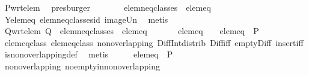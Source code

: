\begin{isabellebody}
\ P{\isacharunderscore}wrt{\isacharunderscore}elem\ \isamarkupfalse%
\ presburger\isanewline
\ \ \isamarkupfalse%
\ \isamarkupfalse%
\ {\isachardoublequoteopen}{\isasymdots}\ {\isacharequal}\ {\isacharquery}elem{\isacharunderscore}neq{\isacharunderscore}classes\ {\isasymunion}\ {\isacharbraceleft}{\isacharquery}elem{\isacharunderscore}eq{\isacharbraceright}\ {\isacharminus}\ {\isacharbraceleft}{\isacharbraceleft}{\isacharbraceright}{\isacharbraceright}{\isachardoublequoteclose}\isanewline
\ \ \ \ \isamarkupfalse%
\ Y{\isacharunderscore}elem{\isacharunderscore}eq\ elem{\isacharunderscore}neq{\isacharunderscore}classes{\isacharunderscore}id\ image{\isacharunderscore}Un\ \isamarkupfalse%
\ metis\isanewline
\ \ \isamarkupfalse%
\ \isamarkupfalse%
\ Q{\isacharunderscore}wrt{\isacharunderscore}elem{\isacharcolon}\ {\isachardoublequoteopen}{\isacharquery}Q\ {\isacharequal}\ {\isacharquery}elem{\isacharunderscore}neq{\isacharunderscore}classes\ {\isasymunion}\ {\isacharbraceleft}{\isacharquery}elem{\isacharunderscore}eq{\isacharbraceright}\ {\isacharminus}\ {\isacharbraceleft}{\isacharbraceleft}{\isacharbraceright}{\isacharbraceright}{\isachardoublequoteclose}\ \isacommand{{\isachardot}}\isamarkupfalse%
\isanewline
\isanewline
\ \ \isamarkupfalse%
\ {\isachardoublequoteopen}{\isacharquery}elem{\isacharunderscore}eq\ {\isacharequal}\ {\isacharbraceleft}{\isacharbraceright}\ {\isasymor}\ {\isacharquery}elem{\isacharunderscore}eq\ {\isasymnotin}\ P{\isachardoublequoteclose}\isanewline
\ \ \ \ \isamarkupfalse%
\ elem{\isacharunderscore}eq{\isacharunderscore}class\ elem{\isacharunderscore}eq{\isacharunderscore}class{\isacharprime}\ non{\isacharunderscore}overlapping\ Diff{\isacharunderscore}Int{\isacharunderscore}distrib{}\ Diff{\isacharunderscore}iff\ empty{\isacharunderscore}Diff\ insert{\isacharunderscore}iff\isanewline
{}\isamarkupfalse%
\ is{\isacharunderscore}non{\isacharunderscore}overlapping{\isacharunderscore}def\ \isamarkupfalse%
\ metis\isanewline
\ \ \isamarkupfalse%
\ \isamarkupfalse%
\ {\isachardoublequoteopen}{\isacharquery}elem{\isacharunderscore}eq\ {\isasymnotin}\ P{\isachardoublequoteclose}\isanewline
\ \ \ \ \isamarkupfalse%
\ non{\isacharunderscore}overlapping\ no{\isacharunderscore}empty{\isacharunderscore}in{\isacharunderscore}non{\isacharunderscore}overlapping\isanewline
\ \ \ \ \isamarkupfalse%

\end{isabellebody}
